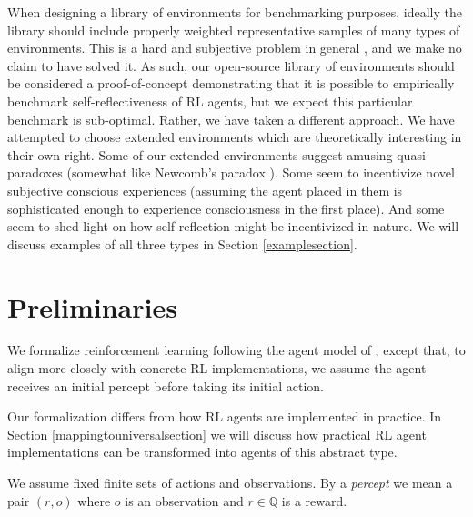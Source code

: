 \documentclass{article}
\begin{document}
When designing a library of environments for benchmarking purposes, ideally the
library should include properly weighted representative samples of many types of
environments. This is a hard and subjective problem in general
\cite{leike2015bad}, and we make no claim to have solved
it. As such, our open-source library of environments should be considered a proof-of-concept
demonstrating that it is possible to empirically benchmark self-reflectiveness of RL
agents, but we expect this particular benchmark is sub-optimal.
Rather, we have taken a different approach.
We have attempted to choose extended environments which are theoretically
interesting in their own right. Some of our extended environments
suggest amusing quasi-paradoxes (somewhat like Newcomb's paradox
\cite{nozick1969newcomb}). Some seem to incentivize novel subjective conscious
experiences (assuming the agent placed in them is sophisticated enough to experience
consciousness in the first place). And some seem to shed light on how self-reflection
might be incentivized in nature. We will discuss examples of all three types in
Section \ref{examplesection}.

\section{Preliminaries}

We formalize reinforcement learning following
the agent model of \cite{hutter2004universal},
except that,
to align more closely with concrete RL implementations,
we assume the agent receives an initial percept before
taking its initial action.

Our formalization differs from how RL agents are
implemented in practice. In Section \ref{mappingtouniversalsection}
we will discuss how practical RL agent implementations can be
transformed into agents of this abstract type.

We assume fixed finite sets of actions and observations. By a \emph{percept}
we mean a pair $(r,o)$ where $o$ is an observation and $r\in\mathbb Q$
is a reward.
\end{document}
